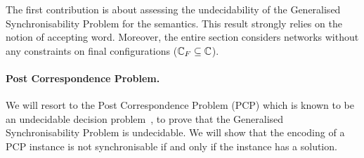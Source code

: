 The first contribution is about assessing the undecidability of the Generalised Synchronisability Problem for the \Mailbox semantics. 
This result strongly relies on the notion of accepting word.
Moreover, the entire section considers networks without any constraints on final configurations (\ie $\mathbb{C}_F \subseteq \mathbb{C}$).  
\paragraph{Post Correspondence Problem.}
We will resort to the Post Correspondence Problem (PCP) which is known to be an undecidable decision problem~\cite{post_variant_1946}, to prove that the Generalised Synchronisability Problem is undecidable. 
We will show that the encoding of a PCP instance \pcpinstance{} is not synchronisable if and only if the instance has a solution. 






